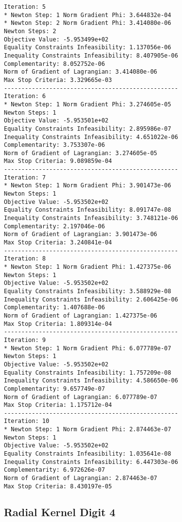 \documentclass{article}
\begin{document}
\begin{minipage}[t]{0.45\textwidth}
\begin{verbatim}
Iteration: 5
* Newton Step: 1 Norm Gradient Phi: 3.644832e-04
* Newton Step: 2 Norm Gradient Phi: 3.414080e-06
Newton Steps: 2
Objective Value: -5.953499e+02
Equality Constraints Infeasibility: 1.137056e-06
Inequality Constraints Infeasibility: 8.407905e-06
Complementarity: 8.052752e-06
Norm of Gradient of Lagrangian: 3.414080e-06
Max Stop Criteria: 3.329665e-03
--------------------------------------------------
Iteration: 6
* Newton Step: 1 Norm Gradient Phi: 3.274605e-05
Newton Steps: 1
Objective Value: -5.953501e+02
Equality Constraints Infeasibility: 2.895986e-07
Inequality Constraints Infeasibility: 4.651022e-06
Complementarity: 3.753307e-06
Norm of Gradient of Lagrangian: 3.274605e-05
Max Stop Criteria: 9.089859e-04
--------------------------------------------------
Iteration: 7
* Newton Step: 1 Norm Gradient Phi: 3.901473e-06
Newton Steps: 1
Objective Value: -5.953502e+02
Equality Constraints Infeasibility: 8.091747e-08
Inequality Constraints Infeasibility: 3.748121e-06
Complementarity: 2.197046e-06
Norm of Gradient of Lagrangian: 3.901473e-06
Max Stop Criteria: 3.240841e-04
--------------------------------------------------
Iteration: 8
* Newton Step: 1 Norm Gradient Phi: 1.427375e-06
Newton Steps: 1
Objective Value: -5.953502e+02
Equality Constraints Infeasibility: 3.588929e-08
Inequality Constraints Infeasibility: 2.606425e-06
Complementarity: 1.407688e-06
Norm of Gradient of Lagrangian: 1.427375e-06
Max Stop Criteria: 1.809314e-04
--------------------------------------------------
Iteration: 9
* Newton Step: 1 Norm Gradient Phi: 6.077789e-07
Newton Steps: 1
Objective Value: -5.953502e+02
Equality Constraints Infeasibility: 1.757209e-08
Inequality Constraints Infeasibility: 4.586650e-06
Complementarity: 9.657749e-07
Norm of Gradient of Lagrangian: 6.077789e-07
Max Stop Criteria: 1.175712e-04
--------------------------------------------------
Iteration: 10
* Newton Step: 1 Norm Gradient Phi: 2.874463e-07
Newton Steps: 1
Objective Value: -5.953502e+02
Equality Constraints Infeasibility: 1.035641e-08
Inequality Constraints Infeasibility: 6.447303e-06
Complementarity: 6.972626e-07
Norm of Gradient of Lagrangian: 2.874463e-07
Max Stop Criteria: 8.430197e-05
\end{verbatim}
\end{minipage}

\subsection{Radial Kernel Digit 4}\label{radial4}
\end{document}

